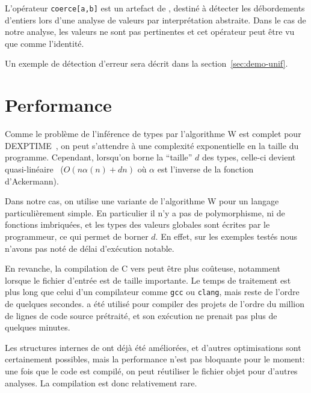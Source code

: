 

L'opérateur \texttt{coerce[a,b]} est un artefact de \newspeak, destiné à
détecter les débordements d'entiers lors d'une analyse de valeurs par
interprétation abstraite. Dans le cas de notre analyse, les valeurs ne sont pas
pertinentes et cet opérateur peut être vu que comme l'identité.

Un exemple de détection d'erreur sera décrit dans la section~\ref{sec:demo-unif}.

\section{Performance}


Comme le problème de l'inférence de types par l'algorithme W est complet pour
DEXPTIME~\cite{mairson}, on peut s'attendre à une complexité exponentielle en la
taille du programme. Cependant, lorsqu'on borne la \enquote{taille} $d$ des
types, celle-ci devient quasi-linéaire~\cite{rta03} ($O(n α(n) + dn)$ où $α$ est
l'inverse de la fonction d'Ackermann).


Dans notre cas, on utilise une variante de l'algorithme W pour un langage
particulièrement simple. En particulier il n'y a pas de polymorphisme, ni de
fonctions imbriquées, et les types des valeurs globales sont écrites par le
programmeur, ce qui permet de borner $d$. En effet, sur les exemples testés nous
n'avons pas noté de délai d'exécution notable.

En revanche, la compilation de C vers \newspeak peut être plus coûteuse,
notamment lorsque le fichier d'entrée est de taille importante. Le temps de
traitement est plus long que celui d'un compilateur comme \texttt{gcc} ou
\texttt{clang}, mais reste de l'ordre de quelques secondes. \ctonewspeak a été
utilisé pour compiler des projets de l'ordre du million de lignes de code source
prétraité, et son exécution ne prenait pas plus de quelques minutes.


Les structures internes de \ctonewspeak ont déjà été améliorées, et d'autres
optimisations sont certainement possibles, mais la performance n'est pas
bloquante pour le moment: une fois que le code est compilé, on peut réutiliser
le fichier objet \newspeak pour d'autres analyses. La compilation est donc
relativement rare.

